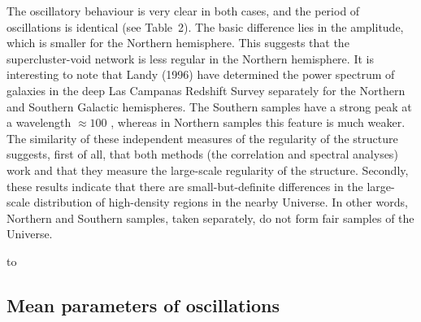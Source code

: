 The oscillatory behaviour is very clear in both cases, and the period of
oscillations is identical (see Table~2). The basic difference lies in the
amplitude, which is smaller for the Northern hemisphere. This suggests that
the supercluster-void network is less regular in the Northern hemisphere. It
is interesting to note that Landy \etal (1996) have determined the power
spectrum of galaxies in the deep Las Campanas Redshift Survey separately for
the Northern and Southern Galactic hemispheres.  The Southern samples have a
strong peak at a wavelength $\approx 100$ \Mpc, whereas in Northern samples
this feature is much weaker. The similarity of these independent measures of
the regularity of the structure suggests, first of all, that both methods (the
correlation and spectral analyses) work and that they measure the large-scale
regularity of the structure. Secondly, these results indicate that there are
small-but-definite differences in the large-scale distribution of high-density
regions in the nearby Universe.  In other words, Northern and Southern
samples, taken separately, do not form fair samples of the Universe.

\begin{table}
\begin{minipage}{120mm}
\caption{ Parameters of the correlation function for 
various cluster samples}
\halign to 
\end{minipage}
\end{table}
    
\subsection{ Mean parameters of oscillations}

